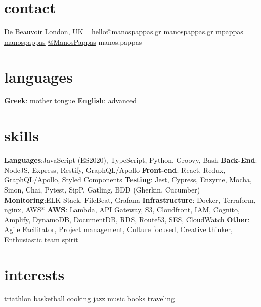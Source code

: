 
\newcommand*{\img}[1]{%
    \raisebox{-.1\baselineskip}{%
        \texttt{[image: \#1]}%
    }%
}


\begin{aside} %
\section{\normalfont contact}
\img{hackney.png} De Beauvoir
London, UK
~
\myNumberUK
\href{mailto:\myEmail}{hello@manospappas.gr}
\href{https://www.manospappas.gr/}{manospappas.gr}
 \hspace{0.02cm} \href{https://github.com/mpappas}{ mpappas}
 \hspace{0.02cm} \href{https://www.linkedin.com/in/manos-pappas}{ manospappas}
 \hspace{0.02cm} \href{https://twitter.com/ManoPappas}{ @ManosPappas}
\raisebox{-0.4ex}{\skype{}} manos.pappas
~
\vspace{-0.4cm}
\section{\normalfont languages}
\textbf{Greek}: mother tongue
\textbf{English}: advanced
~
\vspace{-0.4cm}
\section{\normalfont skills}
\textbf{Languages}:JavaScript (ES2020), TypeScript, Python, Groovy, Bash
\textbf{Back-End}: NodeJS, Express, Restify, GraphQL/Apollo
\textbf{Front-end}: React, Redux, GraphQL/Apollo, Styled Components
\textbf{Testing}: Jest, Cypress, Enzyme, Mocha, Sinon, Chai, Pytest, SipP, Gatling, BDD (Gherkin, Cucumber)
\textbf{Monitoring}:ELK Stack, FileBeat, Grafana
\textbf{Infrastructure}: Docker, Terraform, nginx, AWS*
\textbf{AWS}: Lambda, API Gateway, S3, Cloudfront, IAM, Cognito, Amplify, DynamoDB, DocumentDB, RDS, Route53, SES, CloudWatch
\textbf{Other}: Agile Facilitator, Project management, Culture focused, Creative thinker, Enthusiastic team spirit
~
\vspace{-0.4cm}
\section{\normalfont interests}
triathlon
basketball
cooking
\href{https://open.spotify.com/playlist/3FU39afuJQ9EGzF7SDDUQ8?si=0TY3q524RxW042HSjm-bhQ}{jazz music}
books
traveling
~
\end{aside}

